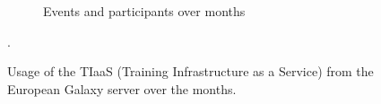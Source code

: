 \documentclass[10pt,letterpaper]{article}
\begin{document}
\begin{figure}[!ht]
\begin{subfigure}[b]{0.45\textwidth}
         \caption{Events and participants over months}
         \label{fig:tiaas-events}
    \end{subfigure}
	\caption{Usage of the TIaaS (Training Infrastructure as a Service) from the European Galaxy server over the months.}. 
	\label{fig:tiaas}
\end{figure}
\end{document}
